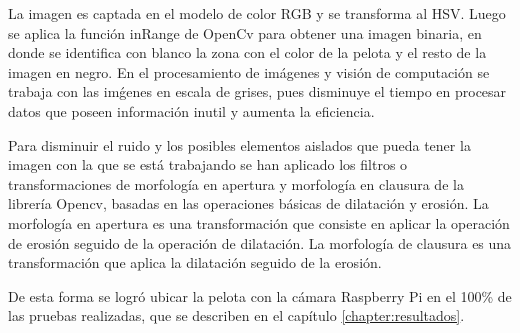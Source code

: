 La imagen es captada en el modelo de color RGB y se transforma al HSV. Luego se aplica la función inRange de OpenCv para obtener una imagen binaria, en donde se identifica con blanco la zona con el color de la pelota y el resto de la imagen en negro. En el procesamiento de im\'agenes y visi\'on de computaci\'on se trabaja con las im\'genes en escala de grises, pues disminuye el tiempo en procesar datos que poseen informaci\'on inutil y aumenta la eficiencia.

Para disminuir el ruido y los posibles elementos aislados que pueda tener la imagen con la que se está trabajando se han aplicado los filtros o transformaciones de morfología en apertura y morfología en clausura de la librería Opencv, basadas en las operaciones básicas de dilatación y erosión. La morfología en apertura es una transformación que consiste en aplicar la operación de erosión seguido de la operación de dilatación. La morfología de clausura es una transformación que aplica la dilatación seguido de la erosión.

De esta forma se logró ubicar la pelota con la cámara Raspberry Pi en el 100\% de las pruebas realizadas, que se describen en el cap\'itulo \ref{chapter:resultados}.


